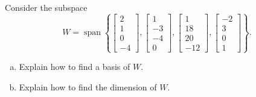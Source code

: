 
\begin{exerciseStatement}


Consider the subspace \[W=\operatorname{span}  \left\{ \left[\begin{array}{c}
2 \\
1 \\
0 \\
-4
\end{array}\right] , \left[\begin{array}{c}
1 \\
-3 \\
-4 \\
0
\end{array}\right] , \left[\begin{array}{c}
1 \\
18 \\
20 \\
-12
\end{array}\right] , \left[\begin{array}{c}
-2 \\
3 \\
0 \\
1
\end{array}\right] \right\} .\]


\begin{enumerate}[(a)]
\item  Explain how to find a basis of \(W\).
\item  Explain how to find the dimension of \(W\).
\end{enumerate}
    
\end{exerciseStatement}
    
